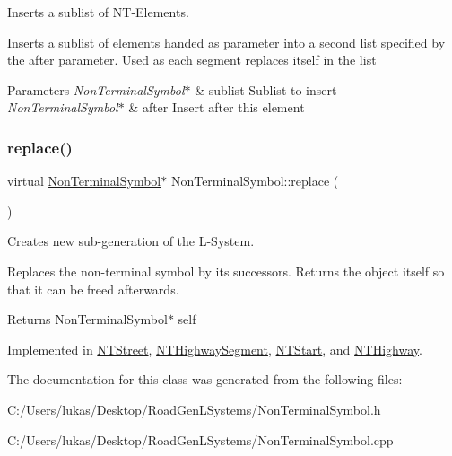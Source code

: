 Inserts a sublist of N\+T-\/\+Elements. 

Inserts a sublist of elements handed as parameter into a second list specified by the after parameter. Used as each segment replaces itself in the list


\begin{DoxyParams}{Parameters}
{\em Non\+Terminal\+Symbol$\ast$} & sublist Sublist to insert \\
\hline
{\em Non\+Terminal\+Symbol$\ast$} & after Insert after this element \\
\hline
\end{DoxyParams}
\hypertarget{class_non_terminal_symbol_ade38f1475002e4f8b41e23d9c787e5e0}{}\label{class_non_terminal_symbol_ade38f1475002e4f8b41e23d9c787e5e0} 
\subsubsection{\texorpdfstring{replace()}{replace()}}
{\footnotesize\ttfamily virtual \hyperlink{class_non_terminal_symbol}{Non\+Terminal\+Symbol}$\ast$ Non\+Terminal\+Symbol\+::replace (\begin{DoxyParamCaption}{ }\end{DoxyParamCaption})\hspace{0.3cm}{\ttfamily [pure virtual]}}



Creates new sub-\/generation of the L-\/\+System. 

Replaces the non-\/terminal symbol by its successors. Returns the object itself so that it can be freed afterwards.

\begin{DoxyReturn}{Returns}
Non\+Terminal\+Symbol$\ast$ self 
\end{DoxyReturn}


Implemented in \hyperlink{class_n_t_street_ac3aa05ca530c99b178a855fc736b1a76}{N\+T\+Street}, \hyperlink{class_n_t_highway_segment_a22518e50d87a70aeb1ead58b26dfa483}{N\+T\+Highway\+Segment}, \hyperlink{class_n_t_start_a3f9897b293a26b301415a9089b90697b}{N\+T\+Start}, and \hyperlink{class_n_t_highway_a5a33cf5f76b36a1d62685408306a54c9}{N\+T\+Highway}.



The documentation for this class was generated from the following files\+:\begin{DoxyCompactItemize}
\item 
C\+:/\+Users/lukas/\+Desktop/\+Road\+Gen\+L\+Systems/Non\+Terminal\+Symbol.\+h\item 
C\+:/\+Users/lukas/\+Desktop/\+Road\+Gen\+L\+Systems/Non\+Terminal\+Symbol.\+cpp\end{DoxyCompactItemize}
